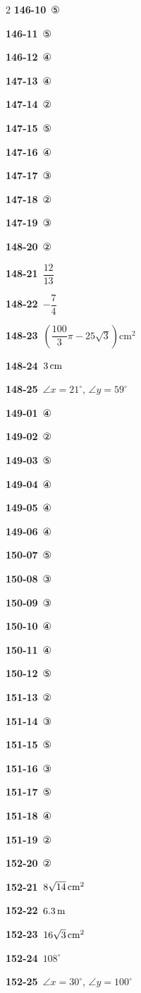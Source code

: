 \documentclass[10pt,a4paper]{article}
\begin{document}
\begin{multicols}{2}
\noindent\textbf{146-10}\ ⑤\par
\noindent\textbf{146-11}\ ⑤\par
\noindent\textbf{146-12}\ ④\par
\noindent\textbf{147-13}\ ④\par
\noindent\textbf{147-14}\ ②\par
\noindent\textbf{147-15}\ ⑤\par
\noindent\textbf{147-16}\ ④\par
\noindent\textbf{147-17}\ ③\par
\noindent\textbf{147-18}\ ②\par
\noindent\textbf{147-19}\ ③\par
\noindent\textbf{148-20}\ ②\par
\noindent\textbf{148-21}\ $\dfrac{12}{13}$\par
\noindent\textbf{148-22}\ $-\dfrac{7}{4}$\par
\noindent\textbf{148-23}\ $\left(\dfrac{100}{3}\pi-25\sqrt{3}\right)\mathrm{cm}^2$\par
\noindent\textbf{148-24}\ $3\mkern3mu \mathrm{cm}$\par
\noindent\textbf{148-25}\ $\angle x=21^\circ$, $\angle y=59^\circ$\par
\noindent\textbf{149-01}\ ④\par
\noindent\textbf{149-02}\ ②\par
\noindent\textbf{149-03}\ ⑤\par
\noindent\textbf{149-04}\ ④\par
\noindent\textbf{149-05}\ ④\par
\noindent\textbf{149-06}\ ④\par
\noindent\textbf{150-07}\ ⑤\par
\noindent\textbf{150-08}\ ③\par
\noindent\textbf{150-09}\ ③\par
\noindent\textbf{150-10}\ ④\par
\noindent\textbf{150-11}\ ④\par
\noindent\textbf{150-12}\ ⑤\par
\noindent\textbf{151-13}\ ②\par
\noindent\textbf{151-14}\ ③\par
\noindent\textbf{151-15}\ ⑤\par
\noindent\textbf{151-16}\ ③\par
\noindent\textbf{151-17}\ ⑤\par
\noindent\textbf{151-18}\ ④\par
\noindent\textbf{151-19}\ ②\par
\noindent\textbf{152-20}\ ②\par
\noindent\textbf{152-21}\ $8\sqrt{14}\mkern3mu \mathrm{cm}^2$\par
\noindent\textbf{152-22}\ $6.3\mkern3mu \mathrm{m}$\par
\noindent\textbf{152-23}\ $16\sqrt{3}\mkern3mu \mathrm{cm}^2$\par
\noindent\textbf{152-24}\ $108^\circ$\par
\noindent\textbf{152-25}\ $\angle x=30^\circ$, $\angle y=100^\circ$\par
\end{multicols}
\end{document}
